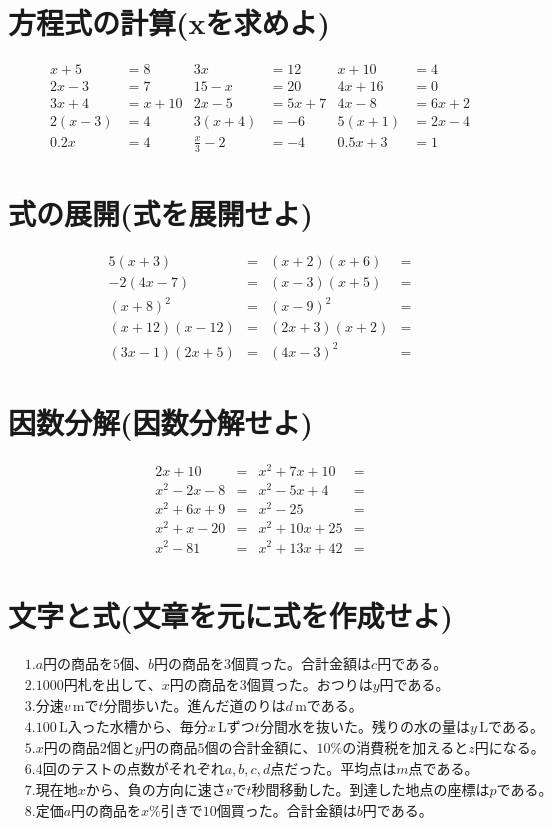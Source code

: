 \documentclass[paper=b4j,landscape,twocolumn,fleqn]{jlreq}
\begin{document}
\newpage
\section{方程式の計算(xを求めよ)}
\begin{align*}
    x + 5 &= 8 & 3x &= 12 & x + 10 &= 4 \\
    2x - 3 &= 7 & 15 - x &= 20 & 4x + 16 &= 0 \\
    3x + 4 &= x + 10 & 2x - 5 &= 5x + 7 & 4x - 8 &= 6x + 2 \\
    2(x - 3) &= 4 & 3(x + 4) &= -6 & 5(x + 1) &= 2x - 4 \\
    0.2x &= 4 & \frac{x}{3} - 2 &= -4 & 0.5x + 3 &= 1 
\end{align*}
\section{式の展開(式を展開せよ)}
\begin{align*}
    5(x+3) &= & (x+2)(x+6) &= \\
    -2(4x-7) &= & (x-3)(x+5) &= \\
    (x+8)^2 &= & (x-9)^2 &= \\
    (x+12)(x-12) &= & (2x+3)(x+2) &= \\
    (3x-1)(2x+5) &= & (4x-3)^2 &= 
\end{align*}
\section{因数分解(因数分解せよ)}
\begin{align*}
    2x+10 &= & x^2+7x+10 &= \\
    x^2-2x-8 &= & x^2-5x+4 &= \\
    x^2+6x+9 &= & x^2-25 &= \\
    x^2+x-20 &= & x^2+10x+25 &= \\
    x^2-81 &= & x^2+13x+42 &= 
\end{align*}
\section{文字と式(文章を元に式を作成せよ)}
\begin{align*}
　&1.　a円の商品を5個、b円の商品を3個買った。合計金額はc円である。\\
　&2.　1000円札を出して、x円の商品を3個買った。おつりはy円である。\\
　&3.　分速v\,\text{m}でt分間歩いた。進んだ道のりはd\,\text{m}である。\\
　&4.　100\,\text{L}入った水槽から、毎分x\,\text{L}ずつt分間水を抜いた。残りの水の量はy\,\text{L}である。\\
　&5.　x円の商品2個とy円の商品5個の合計金額に、10\%の消費税を加えるとz円になる。\\
　&6.　4回のテストの点数がそれぞれa, b, c, d点だった。平均点はm点である。\\
　&7.　現在地xから、負の方向に速さvでt秒間移動した。到達した地点の座標はpである。\\
　&8.　定価a円の商品をx\%引きで10個買った。合計金額はb円である。
\end{align*}
\end{document}
